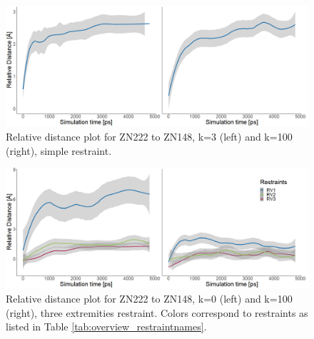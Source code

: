\documentclass[oneside]{scrreprt}
\begin{document}
\begin{figure}[H]
    
    


\includegraphics[width=1\textwidth]{plots/rdcombi_zn222_k3_k100_simple.png}



\caption[Relative distance plot: ZN222 to ZN148, k=3 and k=100 (simple)]{Relative distance plot for ZN222 to ZN148, k=3 (left) and k=100 (right), simple restraint.}\label{fig:reldist_zn222simple}
\end{figure}

\begin{figure}[H]
    
    


\includegraphics[width=1\textwidth]{plots/rdcombi_zn222_k0_k100_ex3.png}



\caption[Relative distance plot: ZN222 to ZN148, k=3 and k=100 (ex3)]{Relative distance plot for ZN222 to ZN148, k=0 (left) and k=100 (right), three extremities restraint. Colors correspond to restraints as listed in Table \ref{tab:overview_restraintnames}.}
\label{fig:reldist_zn222ex3ref}
\end{figure}

\pagebreak
\end{document}
